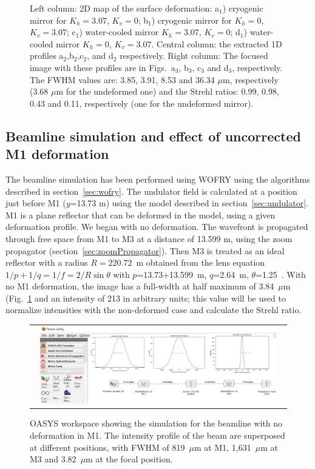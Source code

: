 \documentclass{iucr}
\begin{document}
\begin{figure}
   \caption
   { 
   Left column: 2D map of the surface deformation: a$_1$) cryogenic mirror for $K_h=3.07$, $K_v=0$; b$_1$) cryogenic mirror for $K_h=0$, $K_v=3.07$; c$_1$) water-cooled mirror $K_h=3.07$, $K_v=0$; d$_1$) water-cooled mirror $K_h=0$, $K_v=3.07$. Central column: the extracted 1D profiles a$_2$,b$_2$,c$_2$, and d$_2$ respectively. Right column: The focused image with these profiles are in Figs.~a$_3$, b$_3$, c$_3$ and d$_3$, respectively. 
   The FWHM values are: 3.85, 3.91, 8.53 and 36.34 $\mu$m, respectively (3.68 $\mu$m for the undeformed one) and the Strehl ratios: 0.99, 0.98, 0.43 and 0.11, respectively (one for the undeformed mirror).
   }
   \end{figure} 


\subsection{Beamline simulation and effect of uncorrected M1 deformation}

The beamline simulation has been performed using WOFRY using the algorithms described in section~\ref{sec:wofry}. The undulator field is calculated at a position just before M1 ($y$=13.73 m) using the model described in section~\ref{sec:undulator}. M1 is a plane reflector that can be deformed in the model, using a given deformation profile. We began with no deformation. The wavefront is propagated through free space from M1 to M3 at a distance of 13.599 m, using the zoom propagator (section~\ref{sec:zoomPropagator}). Then M3 is treated as an ideal reflector with a radius $R=220.72$~m obtained from the lens equation $1/p + 1/q=1/f=2/R \sin \theta$ with $p$=13.73+13.599~m, $q$=2.64~m, $\theta$=1.25~\textdegree. With no M1 deformation, the image has a full-width at half maximum of 3.84~$\mu$m (Fig.~\ref{fig:nodeformation} and an intensity of 213 in arbitrary units; this value will be used to normalize intensities with the non-deformed case and calculate the Strehl ratio.

\begin{figure} 
\label{fig:nodeformation} 
\begin{center}
\begin{tabular}{c} 
\includegraphics[width=0.95\textwidth]{figures/wofrynodeformation.png}
\end{tabular}
\end{center}
\caption{ 
OASYS workspace showing the simulation for the beamline with no deformation in M1. The intensity profile of the beam are superposed at different positions, with FWHM of 819~$\mu$m at M1, 1,631~$\mu$m at M3 and 3.82~$\mu$m at the focal position.  }
\end{figure} 
\end{document}
